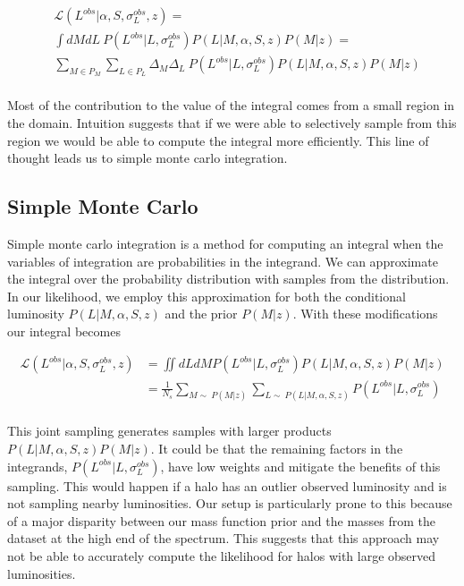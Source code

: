 \documentclass[\docopts]{\docclass}
\begin{document}
\begin{align*}
&\mathcal{L}(L^{obs}|\alpha, S, \sigma_L^{obs}, z) = \\
&\int dMdL\ P(L^{obs}| L, \sigma_L^{obs}) P(L|M,\alpha,S,z)P(M|z) =\\
&\sum_{M \in P_M}\sum_{L \in P_L} \Delta_M\Delta_L\ P(L^{obs}|L, \sigma_L^{obs})P(L|M, \alpha, S, z)P(M|z)\\
\end{align*}

Most of the contribution to the value of the integral comes from a small region in the domain. 
Intuition suggests that if we were able to selectively sample from this region we would be able to compute the integral more efficiently. 
This line of thought leads us to simple monte carlo integration.


\subsection{Simple Monte Carlo}
\label{subsec:smc}

Simple monte carlo integration is a method for computing an integral when the variables of integration are probabilities in the integrand.
We can approximate the integral over the probability distribution with samples from the distribution. 
In our likelihood, we employ this approximation for both the conditional luminosity $P(L|M, \alpha, S, z)$ and the prior $P(M|z)$. With these modifications our integral becomes

{\scriptsize
\begin{align*}
\mathcal{L}(L^{obs}|\alpha, S, \sigma_L^{obs},z) &= \iint dLdM P(L^{obs}|L, \sigma_L^{obs})P(L|M, \alpha, S, z)P(M|z)\\
&= \frac{1}{N_s}\sum_{M \sim\ P(M|z)}\sum_{L \sim\ P(L|M, \alpha, S, z)} P(L^{obs}|L, \sigma_L^{obs})\\
\end{align*}
}

This joint sampling generates samples with larger products $P(L|M, \alpha, S, z)P(M|z)$.
It could be that the remaining factors in the integrands, $P(L^{obs}|L, \sigma_L^{obs})$, have low weights and mitigate the benefits of this sampling.
This would happen if a halo has an outlier observed luminosity and is not sampling nearby luminosities.
Our setup is particularly prone to this because of a major disparity between our mass function prior and the masses from the dataset at the high end of the spectrum. 
This suggests that this approach may not be able to accurately compute the likelihood for halos with large observed luminosities.
\end{document}
